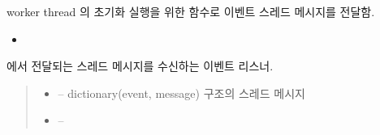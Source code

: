 \documentclass[a4paper,10pt,english]{sphinxmanual}
\begin{document}
\begin{fulllineitems}

\begin{fulllineitems}
\label{\detokenize{_SessionManager:SessionManager._slInit}}
\pysigstartsignatures
{}
\pysigstopsignatures
\sphinxAtStartPar
{\hyperref[\detokenize{_SessionListener:sessionlistener}]{}} worker thread 의 초기화 실행을 위한 함수로  이벤트 스레드 메시지를 전달함.


\nopagebreak

\begin{itemize}
\item {} 
\sphinxAtStartPar
{\hyperref[\detokenize{_SessionListener:SessionListener._smListener}]{}}

\end{itemize}



\end{fulllineitems}


\begin{fulllineitems}
\label{\detokenize{_SessionManager:SessionManager._slListener}}
\pysigstartsignatures
{}
\pysigstopsignatures
\sphinxAtStartPar
{\hyperref[\detokenize{_SessionListener:sessionlistener}]{}} 에서 전달되는 스레드 메시지를 수신하는 이벤트 리스너.
\begin{quote}\begin{description}
\begin{itemize}
\item {} 
\sphinxAtStartPar
{} – dictionary(event, message) 구조의 스레드 메시지

\item {} 
\sphinxAtStartPar
{} – 


\end{itemize}
\end{description}
\end{quote}
\end{fulllineitems}
\end{fulllineitems}
\end{document}
